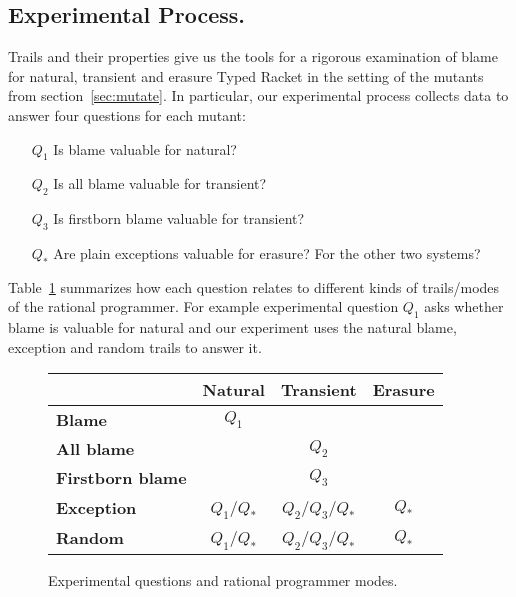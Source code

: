 \subsection{Experimental Process.}

Trails and their properties give us the tools for a rigorous examination
of blame for natural, transient and erasure Typed Racket in the setting of the 
mutants from section~\ref{sec:mutate}. In particular, our experimental
process collects data to answer four questions for each mutant:
\begin{itemize}
\item[$Q_1$] Is blame valuable for natural?

\item[$Q_2$] Is all blame valuable for transient?

\item[$Q_3$] Is firstborn blame valuable for transient?

\item[$Q_*$] Are plain exceptions valuable for
  erasure? For the other two systems? 
\end{itemize}

Table~\ref{fig:experiment-outline} summarizes how each question relates to
different kinds of trails/modes of the rational programmer. For example experimental
question $Q_1$ asks whether blame is valuable for natural and our experiment
uses the natural blame, exception and random trails to answer it.

\begin{figure}
\center
{\begin{tabular}[ht]{l|c|c|c}
                        & {\bf Natural}        & {\bf Transient}          & {\bf Erasure} \\ \hline 
{\bf Blame}             &       $Q_1$          &                          &               \\
{\bf All blame}         &                      &     $Q_2$                &               \\
{\bf Firstborn blame}   &                      &     $Q_3$                &               \\
{\bf Exception}         &       $Q_1$/$Q_*$    &     $Q_2$/$Q_3$/$Q_*$    &      $Q_*$    \\
{\bf Random}            &       $Q_1$/$Q_*$    &     $Q_2$/$Q_3$/$Q_*$    &      $Q_*$    \\
\end{tabular}}
  \caption{ Experimental questions and rational programmer modes.}
  \label{fig:experiment-outline}
\end{figure}

